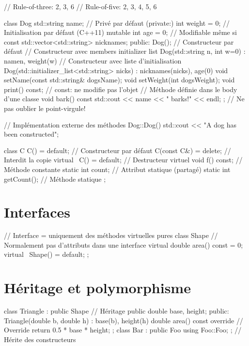 \documentclass{article}
\begin{document}
\begin{multicols*}{4}
\begin{cppcode}
// Rule-of-three: 2, 3, 6
// Rule-of-five: 2, 3, 4, 5, 6

class Dog {
    std::string name; // Privé par défaut (private:)
    int weight = 0; // Initialisation par défaut (C++11)
    mutable int age = 0; // Modifiable même si const
    std::vector<std::string> nicknames;
public:
    Dog(); // Constructeur par défaut
    // Constructeur avec members initializer list
    Dog(std::string n, int w=0) : name{n}, weight(w) {}
    // Constructeur avec liste d'initialisation
    Dog(std::initializer_list<std::string> nicks)
        : nicknames(nicks), age(0) {}
    void setName(const std::string& dogsName);
    void setWeight(int dogsWeight);
    void print() const; // const: ne modifie pas l'objet
    // Méthode définie dans le body d'une classe
    void bark() const { std::cout << name << " barks!" << endl; }
}; // Ne pas oublier le point-virgule!

// Implémentation externe des méthodes
Dog::Dog() {
    std::cout << "A dog has been constructed\n";
}

class C {
    C() = default; // Constructeur par défaut
    C(const C&) = delete; // Interdit la copie
    virtual ~C() = default; // Destructeur virtuel
    void f() const; // Méthode constante
    static int count; // Attribut statique (partagé)
    static int getCount(); // Méthode statique
};
\end{cppcode}

\section*{Interfaces}
\begin{cppcode}
// Interface = uniquement des méthodes virtuelles pures
class Shape {
    // Normalement pas d'attributs dans une interface
    virtual double area() const = 0;
    virtual ~Shape() = default;
};
\end{cppcode}

\section*{Héritage et polymorphisme}
\begin{cppcode}
class Triangle : public Shape { // Héritage public
    double base, height;
public:
    Triangle(double b, double h)
        : base(b), height(h) {}
    double area() const override { // Override
        return 0.5 * base * height; }
};
class Bar : public Foo {
    using Foo::Foo; }; // Hérite des constructeurs


\end{cppcode}
\end{multicols*}
\end{document}
